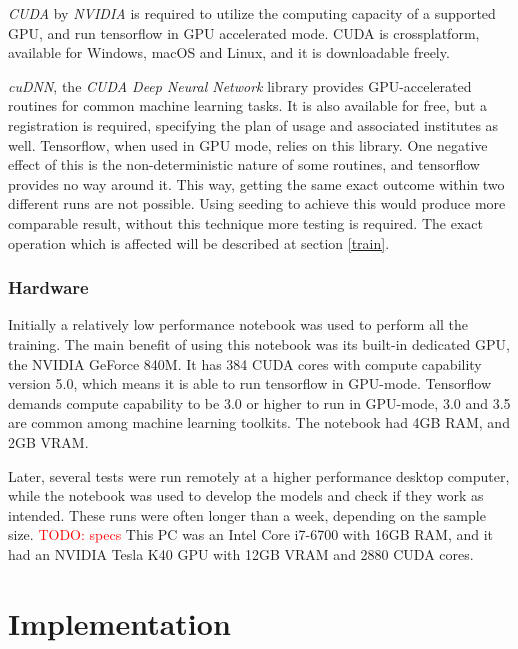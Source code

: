 \documentclass[12pt]{report}
\newcommand\todo[1]{\textcolor{red}{#1}}
\begin{document}
\textit{CUDA} by \textit{NVIDIA} is required to utilize the computing capacity of a supported GPU, and run tensorflow in GPU accelerated mode. CUDA is crossplatform, available for Windows, macOS and Linux, and it is downloadable freely.\par
\label{cudnn}
\textit{cuDNN}, the \textit{CUDA Deep Neural Network} library provides GPU-accelerated routines for common machine learning tasks. It is also available for free, but a registration is required, specifying the plan of usage and associated institutes as well. Tensorflow, when used in GPU mode, relies on this library. One negative effect of this is the non-deterministic nature of some routines, and tensorflow provides no way around it. This way, getting the same exact outcome within two different runs are not possible. Using seeding to achieve this would produce more comparable result, without this technique more testing is required. The exact operation which is affected will be described at section \ref{train}.
\subsection{Hardware}
Initially a relatively low performance notebook was used to perform all the training. The main benefit of using this notebook was its built-in dedicated GPU, the NVIDIA GeForce 840M. It has 384 CUDA cores with compute capability version 5.0, which means it is able to run tensorflow in GPU-mode. Tensorflow demands compute capability to be 3.0 or higher to run in GPU-mode, 3.0 and 3.5 are common among machine learning toolkits. The notebook had 4GB RAM, and 2GB VRAM.\par
Later, several tests were run remotely at a higher performance desktop computer, while the notebook was used to develop the models and check if they work as intended. These runs were often longer than a week, depending on the sample size. \todo{TODO: specs} This PC was an Intel Core i7-6700 with 16GB RAM, and it had an NVIDIA Tesla K40 GPU with 12GB VRAM and 2880 CUDA cores.
\chapter{Implementation}
\end{document}
